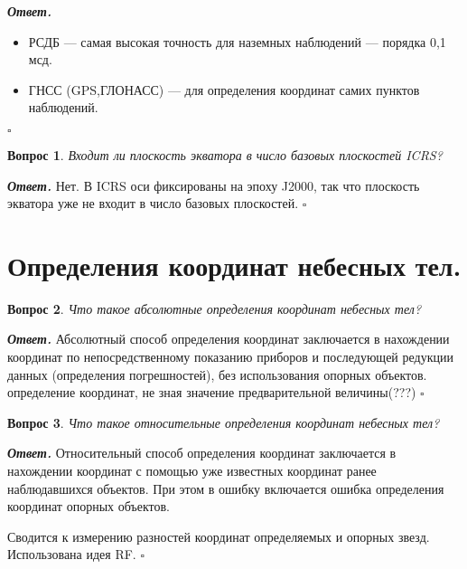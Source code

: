 \documentclass[12pt]{article}
\newtheorem{problem}{Вопрос}
\newenvironment{solution}[1][\it{Ответ}]{\textbf{#1. } }{$\square$}
\begin{document}
	\begin{solution}
		\begin{itemize}
			\item РСДБ — самая высокая точность для наземных наблюдений — порядка 0,1 мсд.
			\item ГНСС (GPS,ГЛОНАСС) — для определения координат самих пунктов наблюдений.
		\end{itemize}
	\end{solution}
	
	\begin{problem}
	Входит ли плоскость экватора в число базовых плоскостей ICRS?
\end{problem}

\begin{solution}
	Нет. В ICRS оси фиксированы на эпоху J2000, так что плоскость экватора уже не входит
	в число базовых плоскостей.
\end{solution}
	
	
\section{Определения координат небесных тел.}
	
	\begin{problem}
		Что такое абсолютные определения координат небесных тел?
	\end{problem}
	
	\begin{solution}
		Абсолютный способ определения координат заключается в нахождении координат по непосредственному показанию приборов и последующей редукции данных (определения погрешностей), без использования опорных объектов.
		определение координат, не зная значение предварительной величины(???)
	\end{solution}
	
	\begin{problem}
		Что такое относительные определения координат небесных тел?
	\end{problem}
	
	\begin{solution}
		Относительный способ определения координат заключается в нахождении координат с
		помощью уже известных координат ранее наблюдавшихся объектов. При этом в ошибку
		включается ошибка определения координат опорных объектов.
		
		Сводится к измерению разностей координат определяемых и опорных звезд. Использована идея RF.
	\end{solution}
	
\end{document}
